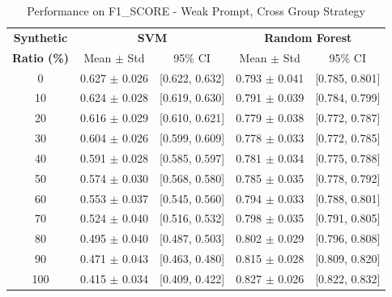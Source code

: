 \begin{table}[h]
\centering
\caption{Performance on F1_SCORE - Weak Prompt, Cross Group Strategy}
\label{tab:weak_cross_group_f1_score}
\begin{tabular}{c|cc|cc}
\hline
\textbf{Synthetic} & \multicolumn{2}{c|}{\textbf{SVM}} & \multicolumn{2}{c}{\textbf{Random Forest}} \\
\textbf{Ratio (\%)} & Mean $\pm$ Std & 95\% CI & Mean $\pm$ Std & 95\% CI \\
\hline
0 & 0.627 $\pm$ 0.026 & [0.622, 0.632] & 0.793 $\pm$ 0.041 & [0.785, 0.801] \\
10 & 0.624 $\pm$ 0.028 & [0.619, 0.630] & 0.791 $\pm$ 0.039 & [0.784, 0.799] \\
20 & 0.616 $\pm$ 0.029 & [0.610, 0.621] & 0.779 $\pm$ 0.038 & [0.772, 0.787] \\
30 & 0.604 $\pm$ 0.026 & [0.599, 0.609] & 0.778 $\pm$ 0.033 & [0.772, 0.785] \\
40 & 0.591 $\pm$ 0.028 & [0.585, 0.597] & 0.781 $\pm$ 0.034 & [0.775, 0.788] \\
50 & 0.574 $\pm$ 0.030 & [0.568, 0.580] & 0.785 $\pm$ 0.035 & [0.778, 0.792] \\
60 & 0.553 $\pm$ 0.037 & [0.545, 0.560] & 0.794 $\pm$ 0.033 & [0.788, 0.801] \\
70 & 0.524 $\pm$ 0.040 & [0.516, 0.532] & 0.798 $\pm$ 0.035 & [0.791, 0.805] \\
80 & 0.495 $\pm$ 0.040 & [0.487, 0.503] & 0.802 $\pm$ 0.029 & [0.796, 0.808] \\
90 & 0.471 $\pm$ 0.043 & [0.463, 0.480] & 0.815 $\pm$ 0.028 & [0.809, 0.820] \\
100 & 0.415 $\pm$ 0.034 & [0.409, 0.422] & 0.827 $\pm$ 0.026 & [0.822, 0.832] \\
\hline
\end{tabular}
\end{table}